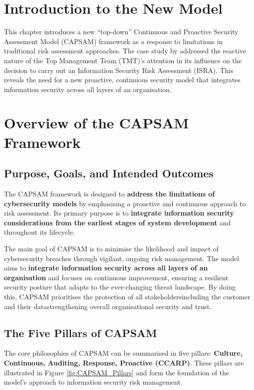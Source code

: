 \section{Introduction to the New Model}
This chapter introduces a new ``top-down'' Continuous and Proactive Security Assessment Model (CAPSAM) framework as a response to limitations in traditional risk assessment approaches. The case study by \citet{shaikh2023information} addressed the reactive nature of the Top Management Team (TMT)'s attention in its influence on the decision to carry out an Information Security Risk Assessment (ISRA). This reveals the need for a new proactive, continuous security model that integrates information security across all layers of an organisation.

\section{Overview of the CAPSAM Framework}
    \subsection{Purpose, Goals, and Intended Outcomes}
    The CAPSAM framework is designed to \textbf{address the limitations of cybersecurity models} by emphasising a proactive and continuous approach to risk assessment. Its primary purpose is to \textbf{integrate information security considerations from the earliest stages of system development} and throughout its lifecycle.

    The main goal of CAPSAM is to minimise the likelihood and impact of cybersecurity breaches through vigilant, ongoing risk management. The model aims to \textbf{integrate information security across all layers of an organisation} and focuses on continuous improvement, ensuring a resilient security posture that adapts to the ever-changing threat landscape. By doing this, CAPSAM prioritises the protection of all stakeholders\textemdash including the customer and their data\textemdash strengthening overall organisational security and trust.

    \subsection{The Five Pillars of CAPSAM}
    The core philosophies of CAPSAM can be summarised in five pillars: \textbf{Culture, Continuous, Auditing, Response, Proactive (CCARP)}. These pillars are illustrated in Figure \ref{fig:CAPSAM_Pillars} and form the foundation of the model's approach to information security risk management.

